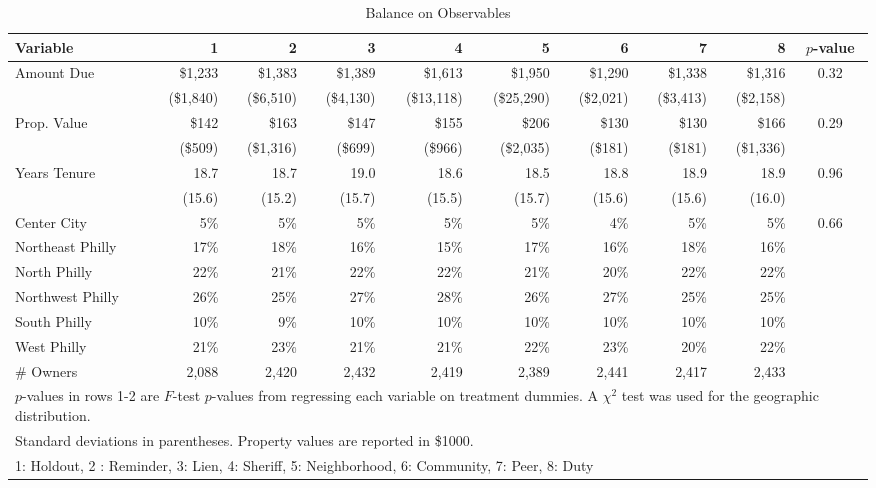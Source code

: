 \documentclass[12pt]{article}
\begin{document}
\begin{sidewaystable}[htbp]
\centering
\caption{Balance on Observables}
\label{balance}
\vspace{10mm}
\begin{tabular}{lrrrrrrrrc}
\hline
Variable & 1 & 2 & 3 & 4 & 5 & 6 & 7 & 8 & $p$-value \\
 \hline
 Amount Due & \$1,233 & \$1,383 & \$1,389 & \$1,613 & \$1,950 & \$1,290 & \$1,338 & \$1,316 & 0.32 \\
 & (\$1,840) & (\$6,510) & (\$4,130) & (\$13,118) & (\$25,290) & (\$2,021) & (\$3,413) & (\$2,158) & \\
Prop. Value & \$142 & \$163 & \$147 &
\$155 & \$206 & \$130 & \$130 & \$166 & 0.29 \\
 & (\$509) & (\$1,316) & (\$699) & (\$966) & (\$2,035) & (\$181) & (\$181) & (\$1,336) & \\
Years Tenure & 18.7 & 18.7 & 19.0 & 18.6 & 18.5 & 18.8 & 18.9 & 18.9 & 0.96 \\
& (15.6) & (15.2) & (15.7) & (15.5) & (15.7) & (15.6) & (15.6) & (16.0) & \\
 Center City & 5\% & 5\% & 5\% & 5\% &
5\% & 4\% & 5\% & 5\% & 0.66 \\ Northeast Philly & 17\% & 18\% &
16\% & 15\% & 17\% & 16\% & 18\% & 16\% & \\ North Philly & 22\%
& 21\% & 22\% & 22\% & 21\% & 20\% & 22\% & 22\% & \\ Northwest
Philly & 26\% & 25\% & 27\% & 28\% & 26\% & 27\% & 25\% & 25\% &
\\ South Philly & 10\% & 9\% & 10\% & 10\% & 10\% & 10\% & 10\%
& 10\% & \\
West Philly & 21\% & 23\% & 21\% & 21\% & 22\% &
23\% & 20\% & 22\% & \\ \# Owners & 2,088 & 2,420 & 2,432 & 2,419 &
2,389 & 2,441 & 2,417 & 2,433 & \\ \hline
\multicolumn{10}{l}{\scriptsize{$p$-values in rows 1-2 are $F$-test
    $p$-values from regressing each variable on treatment dummies. A
    $\chi^2$ test was used for the geographic distribution.}} \\
\multicolumn{10}{l}{\scriptsize{ Standard deviations in
    parentheses. Property values are reported in \$1000. }}\\
\multicolumn{10}{l}{\scriptsize{1: Holdout, 2 : Reminder, 3: Lien, 4:
    Sheriff, 5: Neighborhood, 6: Community, 7: Peer, 8: Duty}} \\
\end{tabular}
\end{sidewaystable}
\end{document}
